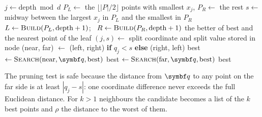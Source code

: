\documentclass[11pt]{article}
\begin{document}
\begin{algorithm}[htbp]
\caption{$k$-d tree: construction and nearest-neighbour search}
\label{alg:kdtree}
\begin{algorithmic}[1]
 
   \Return {} \EndIf
  \State $j \gets \text{depth} \bmod d$ 
  \State $P_L \gets$ the $\lfloor |P|/2 \rfloor$ points with smallest $x_j$, $P_R \gets$ the rest
  \State $s \gets$ midway between the largest $x_j$ in $P_L$ and the smallest in $P_R$
  \State $L \gets \Call{Build}{P_L, \text{depth} + 1}$; \ $R \gets \Call{Build}{P_R, \text{depth} + 1}$
  \State \Return {}
\EndFunction
{} 
    \State \Return the better of best and the nearest point of the leaf 
  \EndIf
  \State $(j, s) \gets$ split coordinate and split value stored in node
  \State (near, far) $\gets$ (left, right) \textbf{if} $q_j < s$ \textbf{else} (right, left)
  \State best $\gets \Call{Search}{\text{near}, \vect{q}, \text{best}}$
   
    \State best $\gets \Call{Search}{\text{far}, \vect{q}, \text{best}}$
  \EndIf
  \State \Return best
\EndFunction
\end{algorithmic}
\end{algorithm}

The pruning test is safe because the distance from $\vect{q}$ to any point on the far side is at least
$|q_j - s|$: one coordinate difference never exceeds the full Euclidean distance. For $k > 1$ neighbours the candidate
becomes a list of the $k$ best points and $\rho$ the distance to the worst of them.
\end{document}
